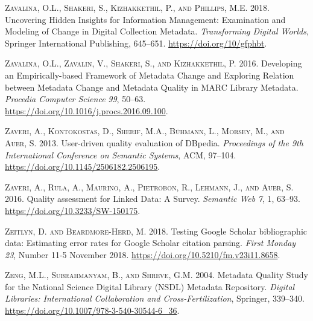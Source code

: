 \textsc{Zavalina, O.L., Shakeri, S., Kizhakkethil, P., and Phillips, M.E.} 2018. Uncovering Hidden Insights for Information Management: Examination and Modeling of Change in Digital Collection Metadata. \emph{Transforming Digital Worlds}, Springer International Publishing, 645–651. \url{https://doi.org/10/gfphbt}.

\textsc{Zavalina, O.L., Zavalin, V., Shakeri, S., and Kizhakkethil, P.} 2016. Developing an Empirically-based Framework of Metadata Change and Exploring Relation between Metadata Change and Metadata Quality in MARC Library Metadata. \emph{Procedia Computer Science} \emph{99}, 50–63. \url{https://doi.org/10.1016/j.procs.2016.09.100}.

\textsc{Zaveri, A., Kontokostas, D., Sherif, M.A., Bühmann, L., Morsey, M., and Auer, S.} 2013. User-driven quality evaluation of DBpedia. \emph{Proceedings of the 9th International Conference on Semantic Systems}, ACM, 97–104. \url{https://doi.org/10.1145/2506182.2506195}.

\textsc{Zaveri, A., Rula, A., Maurino, A., Pietrobon, R., Lehmann, J., and Auer, S.} 2016. Quality assessment for Linked Data: A Survey. \emph{Semantic Web} \emph{7}, 1, 63–93. \url{https://doi.org/10.3233/SW-150175}.

\textsc{Zeitlyn, D. and Beardmore-Herd, M.} 2018. Testing Google Scholar bibliographic data: Estimating error rates for Google Scholar citation parsing. \emph{First Monday} \emph{23}, Number 11-5 November 2018. \url{https://doi.org/10.5210/fm.v23i11.8658}.

\textsc{Zeng, M.L., Subrahmanyam, B., and Shreve, G.M.} 2004. Metadata Quality Study for the National Science Digital Library (NSDL) Metadata Repository. \emph{Digital Libraries: International Collaboration and Cross-Fertilization}, Springer, 339–340. \url{https://doi.org/10.1007/978-3-540-30544-6_36}.
